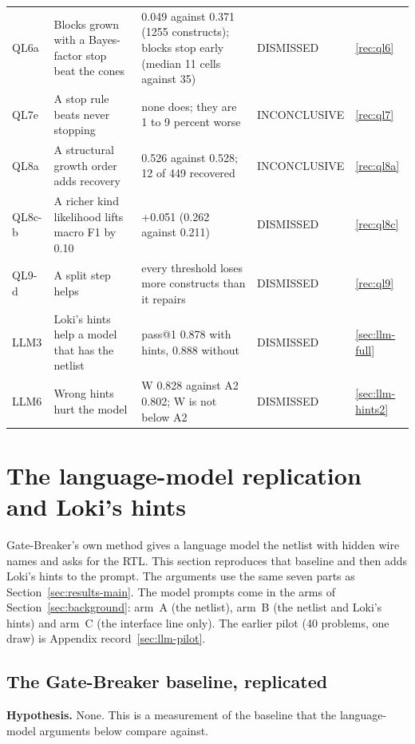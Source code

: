 \documentclass[conference]{IEEEtran}
\newcommand{\hev}[1]{\par\smallskip\noindent\textbf{#1}}
\begin{document}
\begin{table}[t]
\begin{tabular}{@{}p{}p{}p{}p{}p{}@{}}
QL6a & Blocks grown with a Bayes-factor stop beat the cones & 0.049 against 0.371 (1255 constructs); blocks stop early (median 11 cells against 35) & DISMISSED & \ref{rec:ql6} \\
QL7e & A stop rule beats never stopping & none does; they are 1 to 9 percent worse & INCONCLUSIVE & \ref{rec:ql7} \\
QL8a & A structural growth order adds recovery & 0.526 against 0.528; 12 of 449 recovered & INCONCLUSIVE & \ref{rec:ql8a} \\
QL8c-b & A richer kind likelihood lifts macro F1 by 0.10 & +0.051 (0.262 against 0.211) & DISMISSED & \ref{rec:ql8c} \\
QL9-d & A split step helps & every threshold loses more constructs than it repairs & DISMISSED & \ref{rec:ql9} \\
LLM3 & Loki's hints help a model that has the netlist & pass@1 0.878 with hints, 0.888 without & DISMISSED & \ref{sec:llm-full} \\
LLM6 & Wrong hints hurt the model & W 0.828 against A2 0.802; W is not below A2 & DISMISSED & \ref{sec:llm-hints2} \\
\bottomrule
\end{tabular}
\end{table}

\section{The language-model replication and Loki's hints}
\label{sec:llm}

Gate-Breaker's own method gives a language model the netlist with hidden wire names and asks for the RTL. This section reproduces that baseline and then adds Loki's hints to the prompt. The arguments use the same seven parts as Section~\ref{sec:results-main}. The model prompts come in the arms of Section~\ref{sec:background}: arm~A (the netlist), arm~B (the netlist and Loki's hints) and arm~C (the interface line only). The earlier pilot (40 problems, one draw) is Appendix record~\ref{sec:llm-pilot}.

\subsection{The Gate-Breaker baseline, replicated}
\label{arg:la1}
\label{sec:gb-results}

\hev{Hypothesis.} None. This is a measurement of the baseline that the language-model arguments below compare against.
\end{document}
